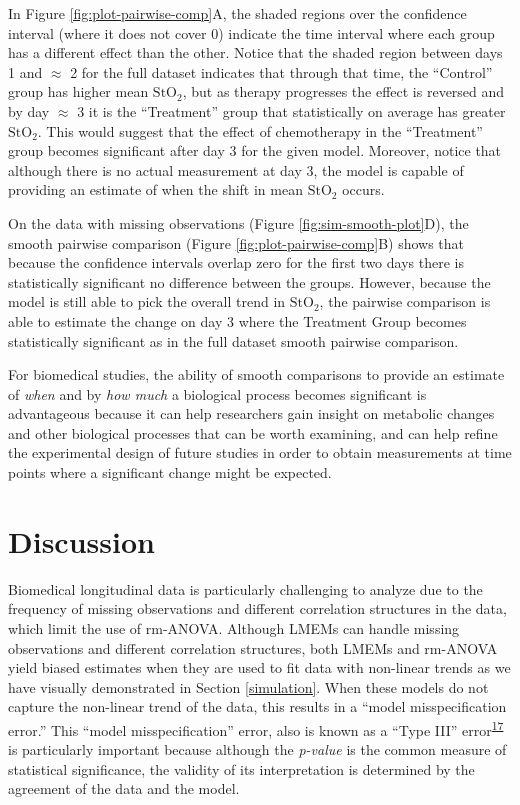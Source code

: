 \documentclass[
]{article}
\begin{document}
In Figure \ref{fig:plot-pairwise-comp}A, the shaded regions over the confidence interval (where it does not cover 0) indicate the time interval where each group has a different effect than the other. Notice that the shaded region between days 1 and \(\approx\) 2 for the full dataset indicates that through that time, the ``Control'' group has higher mean \(\mbox{StO}_2\), but as therapy progresses the effect is reversed and by day \(\approx\) 3 it is the ``Treatment'' group that statistically on average has greater \(\mbox{StO}_2\). This would suggest that the effect of chemotherapy in the ``Treatment'' group becomes significant after day 3 for the given model. Moreover, notice that although there is no actual measurement at day 3, the model is capable of providing an estimate of when the shift in mean \(\mbox{StO}_2\) occurs.

On the data with missing observations (Figure \ref{fig:sim-smooth-plot}D), the smooth pairwise comparison (Figure \ref{fig:plot-pairwise-comp}B) shows that because the confidence intervals overlap zero for the first two days there is statistically significant no difference between the groups. However, because the model is still able to pick the overall trend in \(\mbox{StO}_2\), the pairwise comparison is able to estimate the change on day 3 where the Treatment Group becomes statistically significant as in the full dataset smooth pairwise comparison.

For biomedical studies, the ability of smooth comparisons to provide an estimate of \emph{when} and by \emph{how much} a biological process becomes significant is advantageous because it can help researchers gain insight on metabolic changes and other biological processes that can be worth examining, and can help refine the experimental design of future studies in order to obtain measurements at time points where a significant change might be expected.

\hypertarget{discussion}{%
\section{Discussion}\label{discussion}}

Biomedical longitudinal data is particularly challenging to analyze due to the frequency of missing observations and different correlation structures in the data, which limit the use of rm-ANOVA. Although LMEMs can handle missing observations and different correlation structures, both LMEMs and rm-ANOVA yield biased estimates when they are used to fit data with non-linear trends as we have visually demonstrated in Section \ref{simulation}. When these models do not capture the non-linear trend of the data, this results in a ``model misspecification error.'' This ``model misspecification'' error, also is known as a ``Type III'' error\textsuperscript{\protect\hyperlink{ref-dennis2019}{17}} is particularly important because although the \emph{p-value} is the common measure of statistical significance, the validity of its interpretation is determined by the agreement of the data and the model.
\end{document}
